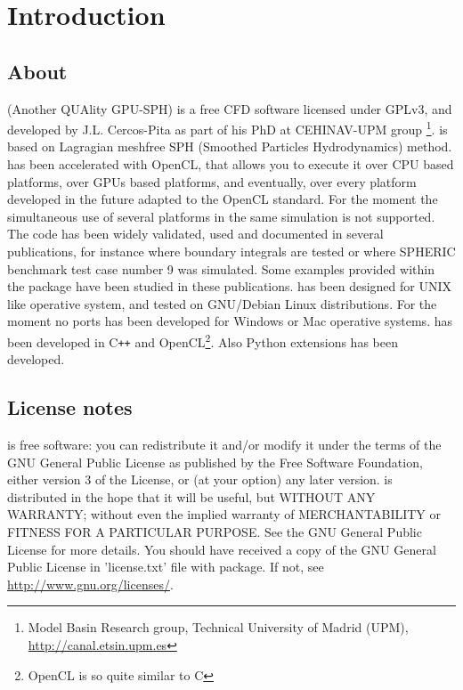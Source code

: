\chapter{Introduction}
\label{s:introduction}
%
\section{About \NAME}
%
\NAME (Another QUAlity GPU-SPH) is a free CFD software licensed under GPLv3,
and developed by J.L. Cercos-Pita as part of his PhD at CEHINAV-UPM group
\footnote{Model Basin Research group, Technical University of Madrid (UPM),
\url{http://canal.etsin.upm.es}}. \NAME is based on Lagragian meshfree SPH
(Smoothed Particles Hydrodynamics) method.\rc
%
\NAME has been accelerated with OpenCL, that allows you to execute it over
CPU based platforms, over GPUs based platforms, and eventually, over every platform
developed in the future adapted to the OpenCL standard. For the moment the simultaneous
use of several platforms in the same simulation is not supported.\rc
%
The code has been widely validated, used and documented in several publications, for
instance \citet{Maciaetal_PTP_2012} where boundary integrals are tested or
\citet{perezrojas_cercos_stab12} where SPHERIC benchmark test case number 9 was simulated.
Some examples provided within the package have been studied in these publications.\rc
%
\NAME has been designed for UNIX like operative system, and tested on GNU/Debian Linux
distributions. For the moment no ports has been developed for Windows or Mac operative
systems.
%
\NAME has been developed in C\texttt{++} and OpenCL\footnote{OpenCL is so quite similar
to C}. Also Python extensions has been developed.
%
\section{License notes}
%
\NAME is free software: you can redistribute it and/or modify
it under the terms of the GNU General Public License as published by
the Free Software Foundation, either version 3 of the License, or
(at your option) any later version.\rc
%
\NAME is distributed in the hope that it will be useful,
but WITHOUT ANY WARRANTY; without even the implied warranty of
MERCHANTABILITY or FITNESS FOR A PARTICULAR PURPOSE.  See the
GNU General Public License for more details.\rc
%
You should have received a copy of the GNU General Public License
in 'license.txt' file with \NAME package. If not, see
\url{http://www.gnu.org/licenses/}.
%
